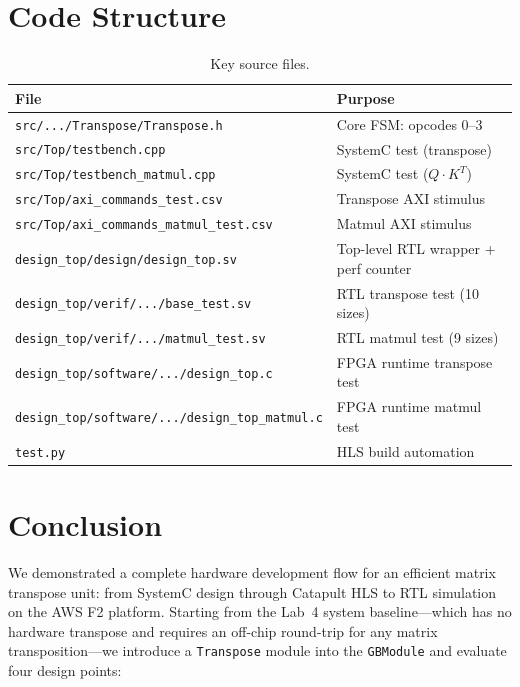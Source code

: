 \documentclass[11pt]{article}
\begin{document}
\section{Code Structure}
\label{sec:code}

\begin{table}[h]
\centering\small
\begin{tabular}{@{}ll@{}}
\toprule
File & Purpose \\
\midrule
\texttt{src/.../Transpose/Transpose.h} & Core FSM: opcodes 0--3 \\
\texttt{src/Top/testbench.cpp} & SystemC test (transpose) \\
\texttt{src/Top/testbench\_matmul.cpp} & SystemC test ($Q\!\cdot\!K^T$) \\
\texttt{src/Top/axi\_commands\_test.csv} & Transpose AXI stimulus \\
\texttt{src/Top/axi\_commands\_matmul\_test.csv} & Matmul AXI stimulus \\
\texttt{design\_top/design/design\_top.sv} & Top-level RTL wrapper + perf counter \\
\texttt{design\_top/verif/.../base\_test.sv} & RTL transpose test (10 sizes) \\
\texttt{design\_top/verif/.../matmul\_test.sv} & RTL matmul test (9 sizes) \\
\texttt{design\_top/software/.../design\_top.c} & FPGA runtime transpose test \\
\texttt{design\_top/software/.../design\_top\_matmul.c} & FPGA runtime matmul test \\
\texttt{test.py} & HLS build automation \\
\bottomrule
\end{tabular}
\caption{Key source files.}
\end{table}


\section{Conclusion}

We demonstrated a complete hardware development flow for an efficient matrix
transpose unit: from SystemC design through Catapult HLS to RTL simulation on
the AWS F2 platform. Starting from the Lab~4 system baseline---which has no
hardware transpose and requires an off-chip round-trip for any matrix
transposition---we introduce a \texttt{Transpose} module into the
\texttt{GBModule} and evaluate four design points:
\end{document}
